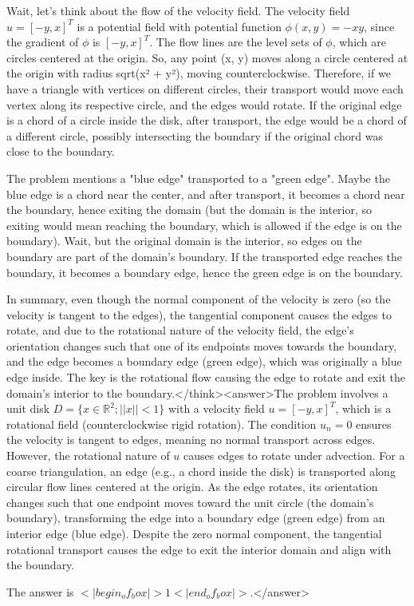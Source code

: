 Wait, let's think about the flow of the velocity field. The velocity field \( u = [-y, x]^T \) is a potential field with potential function \( \phi(x, y) = -xy \), since the gradient of \( \phi \) is \( [-y, x]^T \). The flow lines are the level sets of \( \phi \), which are circles centered at the origin. So, any point (x, y) moves along a circle centered at the origin with radius sqrt(x² + y²), moving counterclockwise. Therefore, if we have a triangle with vertices on different circles, their transport would move each vertex along its respective circle, and the edges would rotate. If the original edge is a chord of a circle inside the disk, after transport, the edge would be a chord of a different circle, possibly intersecting the boundary if the original chord was close to the boundary. 

The problem mentions a "blue edge" transported to a "green edge". Maybe the blue edge is a chord near the center, and after transport, it becomes a chord near the boundary, hence exiting the domain (but the domain is the interior, so exiting would mean reaching the boundary, which is allowed if the edge is on the boundary). Wait, but the original domain is the interior, so edges on the boundary are part of the domain's boundary. If the transported edge reaches the boundary, it becomes a boundary edge, hence the green edge is on the boundary. 

In summary, even though the normal component of the velocity is zero (so the velocity is tangent to the edges), the tangential component causes the edges to rotate, and due to the rotational nature of the velocity field, the edge's orientation changes such that one of its endpoints moves towards the boundary, and the edge becomes a boundary edge (green edge), which was originally a blue edge inside. The key is the rotational flow causing the edge to rotate and exit the domain's interior to the boundary.</think><answer>The problem involves a unit disk \( D = \{x \in \mathbb{R}^2; ||x|| < 1\} \) with a velocity field \( u = [-y, x]^T \), which is a rotational field (counterclockwise rigid rotation). The condition \( u_n = 0 \) ensures the velocity is tangent to edges, meaning no normal transport across edges. However, the rotational nature of \( u \) causes edges to rotate under advection. For a coarse triangulation, an edge (e.g., a chord inside the disk) is transported along circular flow lines centered at the origin. As the edge rotates, its orientation changes such that one endpoint moves toward the unit circle (the domain's boundary), transforming the edge into a boundary edge (green edge) from an interior edge (blue edge). Despite the zero normal component, the tangential rotational transport causes the edge to exit the interior domain and align with the boundary.  

The answer is \(<|begin_of_box|>1<|end_of_box|>\).</answer>